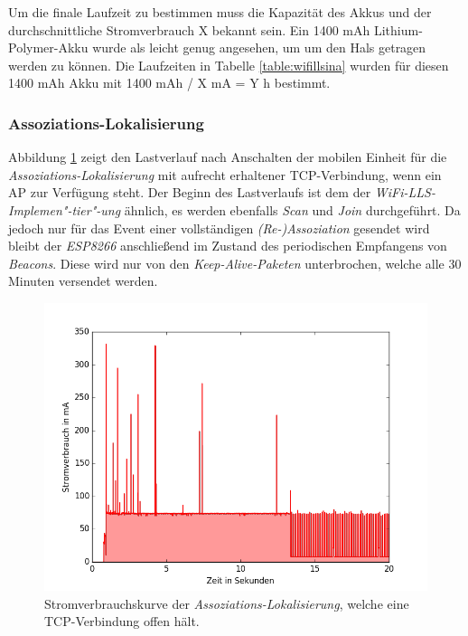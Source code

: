 Um die finale Laufzeit zu bestimmen muss die Kapazität des Akkus und der durchschnittliche Stromverbrauch X bekannt sein.
Ein 1400 mAh Lithium-Polymer-Akku wurde als leicht genug angesehen, um um den Hals getragen werden zu können.
Die Laufzeiten in Tabelle \ref{table:wifillsina} wurden für diesen 1400 mAh Akku mit 1400 mAh / X mA = Y h bestimmt.



\subsubsection{Assoziations-Lokalisierung}
\label{ch:phase1:sec:powerindirekt}
Abbildung \ref{fig:tcphold} zeigt den Lastverlauf nach Anschalten der mobilen Einheit für die \emph{Assoziations-Lokalisierung} mit aufrecht erhaltener TCP-Verbindung, wenn ein AP zur Verfügung steht. 
Der Beginn des Lastverlaufs ist dem der \emph{WiFi-LLS-Implemen"-tier"-ung} ähnlich, es werden ebenfalls \emph{Scan} und \emph{Join} durchgeführt.
Da jedoch nur für das Event einer vollständigen \emph{(Re-)Assoziation} gesendet wird bleibt der \emph{ESP8266} anschließend im Zustand des periodischen Empfangens von \emph{Beacons}.
Diese wird nur von den \emph{Keep-Alive-Paketen} unterbrochen, welche alle 30 Minuten versendet werden.

\begin{figure}[h!]
  \centering
	\includegraphics[width=\textwidth]{plots/tcphold.png}
  \caption{Stromverbrauchskurve der \emph{Assoziations-Lokalisierung}, welche eine TCP-Verbindung offen hält.}
  \label{fig:tcphold}
\end{figure}

